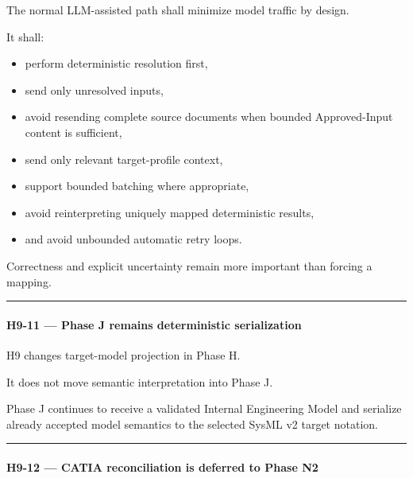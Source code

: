The normal LLM-assisted path shall minimize model traffic by design.

It shall:

\begin{itemize}
\tightlist
\item
  perform deterministic resolution first,
\item
  send only unresolved inputs,
\item
  avoid resending complete source documents when bounded Approved-Input content is sufficient,
\item
  send only relevant target-profile context,
\item
  support bounded batching where appropriate,
\item
  avoid reinterpreting uniquely mapped deterministic results,
\item
  and avoid unbounded automatic retry loops.
\end{itemize}

Correctness and explicit uncertainty remain more important than forcing a mapping.

\begin{center}\rule{0.5\linewidth}{0.5pt}\end{center}

\hypertarget{h9-11--phase-j-remains-deterministic-serialization}{%
\paragraph{H9-11 --- Phase J remains deterministic serialization}\label{h9-11--phase-j-remains-deterministic-serialization}}

H9 changes target-model projection in Phase H.

It does not move semantic interpretation into Phase J.

Phase J continues to receive a validated Internal Engineering Model and serialize already accepted model semantics to the selected SysML v2 target notation.

\begin{center}\rule{0.5\linewidth}{0.5pt}\end{center}

\hypertarget{h9-12--catia-reconciliation-is-deferred-to-phase-n2}{%
\paragraph{H9-12 --- CATIA reconciliation is deferred to Phase N2}\label{h9-12--catia-reconciliation-is-deferred-to-phase-n2}}

